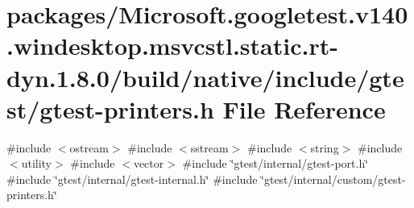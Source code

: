 \hypertarget{gtest-printers_8h}{}\section{packages/\+Microsoft.googletest.\+v140.\+windesktop.\+msvcstl.\+static.\+rt-\/dyn.1.8.0/build/native/include/gtest/gtest-\/printers.h File Reference}
\label{gtest-printers_8h}
{\ttfamily \#include $<$ostream$>$}\newline
{\ttfamily \#include $<$sstream$>$}\newline
{\ttfamily \#include $<$string$>$}\newline
{\ttfamily \#include $<$utility$>$}\newline
{\ttfamily \#include $<$vector$>$}\newline
{\ttfamily \#include \char`\"{}gtest/internal/gtest-\/port.\+h\char`\"{}}\newline
{\ttfamily \#include \char`\"{}gtest/internal/gtest-\/internal.\+h\char`\"{}}\newline
{\ttfamily \#include \char`\"{}gtest/internal/custom/gtest-\/printers.\+h\char`\"{}}\newline
